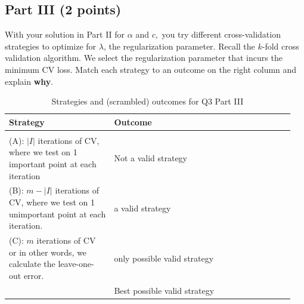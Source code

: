 \documentclass[12pt]{article}
\begin{document}
\subsection*{Part III (2 points)}
With your solution in Part II for $\alpha$ and $c,$ you try different cross-validation strategies to optimize for $\lambda$, the regularization parameter. 
Recall the $k$-fold cross validation algorithm. We select the regularization parameter that incurs the minimum CV loss. 
Match each strategy to an outcome on the right column and explain {\bf why}.
\begin{table}[h]
    \centering
    \begin{tabular}{p{0.35\linewidth} | p{0.6\linewidth}}
        Strategy & Outcome  \\
        \hline \\
         (A): $|I|$ iterations of CV, where we test on 1 important point at each iteration  & Not a valid strategy \\
         (B): $m - |I|$ iterations of CV, where we test on 1 unimportant point at each iteration.  & a valid strategy \\
         (C): $m$ iterations of CV or in other words, we calculate the leave-one-out error.  & only possible valid strategy\\
          & Best possible valid strategy \\
          \hline
    \end{tabular}
    \caption{Strategies and (scrambled) outcomes for Q3 Part III}
    \label{tab:my_label}
\end{table}
\end{document}
